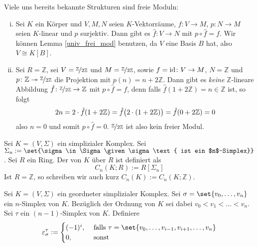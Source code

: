 \begin{beispiel}[{name=[freie Moduln]}]
	Viele uns bereits bekannte Strukturen sind freie Moduln:
	\begin{enumerate}[(i)]
		\item Sei $K$ ein Körper und $V,M,N$ seien $K$-Vektorräume, $f\colon V \to M$, $p\colon N \to M$ seien $K$-linear und $p$ surjektiv. 
		Dann gibt es $\hat{f}\colon V\to N$ mit $p \circ \hat{f} = f$. 
		Wir können Lemma \ref{univ_frei_mod} benutzen, da $V$ eine Basis $B$ hat, also $V \cong K[B]$.
		\item Sei $R=\mathbb{Z}$, sei $V= \nicefrac{\mathbb{Z}}{2 \mathbb{Z}}$ und $M = \nicefrac{\mathbb{Z}}{2 \mathbb{Z}}$, sowie $f= \id \colon V \to M$, $N= \mathbb{Z}$ und $p \colon \mathbb{Z} \twoheadrightarrow \nicefrac{\mathbb{Z}}{2 \mathbb{Z}}$ die Projektion mit $p(n)= n + 2 \mathbb{Z}$. 
		Dann gibt es \emph{keine} $\mathbb{Z}$-lineare Abbildung $\hat{f} \colon \nicefrac{\mathbb{Z}}{2 \mathbb{Z}} \to \mathbb{Z}$ mit $p \circ \hat{f} = f$, denn falls $\hat{f} (1+ 2 \mathbb{Z}) = n \in \mathbb{Z}$ ist, so folgt 
		\[
			2 n = 2 \cdot \hat{f}(1+ 2 \mathbb{Z}) = \hat{f} \enbrace[\big]{2 \cdot (1+ 2 \mathbb{Z})} = \hat{f} (0+ 2 \mathbb{Z}) =0
		\]
		also $n=0$ und somit $p \circ \hat{f}=0$. 
		$\nicefrac{\mathbb{Z}}{2 \mathbb{Z}}$ ist also kein freier Modul.
	\end{enumerate}
\end{beispiel}

\begin{definition}[{name=[{$n$-ter Kettenmodul}]}]
	Sei $K=(V, \Sigma)$ ein simplizialer Komplex. Sei $\Sigma_n := \set{\sigma \in \Sigma \given \sigma \text{ ist ein $n$-Simplex}}$. Sei $R$ ein Ring. Der 
	 von $K$ über $R$ ist definiert als 
	\[
		C_n(K;R) := R[\Sigma_n]
	\]
	Ist $R=\mathbb{Z}$, so schreiben wir auch kurz $C_n(K) := C_n(K;\mathbb{Z})$.
\end{definition}

\begin{definition}[{name=[{Orientierung eines $(n-1)$-Simplizes als Teilmenge eines $n$-Simplizes}]}]
	Sei $K=(V,\Sigma)$ ein geordneter simplizialer Komplex. 
	Sei $\sigma = \set{v_0, \ldots ,v_n}$ ein $n$-Simplex von $K$. 
	Bezüglich der Ordnung von $K$ sei dabei $v_0 < v_1 < \ldots < v_n$. 
	Sei $\tau$ ein $(n-1)$-Simplex von $K$. Definiere
	\[
		\varepsilon_\sigma^\tau := \begin{cases}
			(-1)^i, &\text{ falls }\tau = \set{v_0, \ldots , v_{i-1}, v_{i+1}, \ldots , v_n} \\
			0 , &\text{ sonst}
		\end{cases}
	\]
\end{definition}

